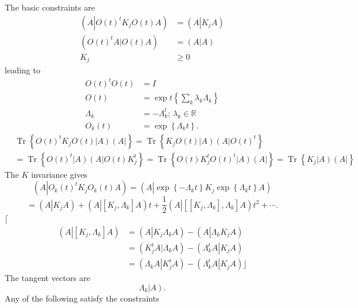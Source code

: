 \documentclass[aps,preprint]{revtex4}%
\begin{document}
The basic constraints are
\begin{align}
\left(  A\left\vert O\left(  t\right)  ^{t}K_{j}O\left(  t\right)  A\right.
\right)    & =\left(  A\left\vert K_{j}A\right.  \right)  \label{inv}\\
\left(  O\left(  t\right)  ^{t}A\left\vert O\left(  t\right)  A\right.
\right)    & =\left(  A\left\vert A\right.  \right)  \label{normaliz}\\
K_{j}  & \geq0\label{positiv}%
\end{align}
leading to
\begin{align}
O\left(  t\right)  ^{t}O\left(  t\right)   &  =I\\
O\left(  t\right)   &  =\exp t\left\{  \sum_{k}\lambda_{k}\Lambda_{k}\right\}
\\
\Lambda_{k} &  =-\Lambda_{k}^{t};\,\lambda_{k}\in\mathbb{R}\\
O_{k}\left(  t\right)   &  =\exp\left\{  \Lambda_{k}t\right\}  .
\end{align}%
\begin{align}
& \operatorname{Tr}\left\{  O\left(  t\right)  ^{t}K_{j}O\left(  t\right)
\left\vert A\right)  \left(  A\right\vert \right\}  =\operatorname{Tr}\left\{
K_{j}O\left(  t\right)  \left\vert A\right)  \left(  A\right\vert O\left(
t\right)  ^{t}\right\}  \\
& =\operatorname{Tr}\left\{  O\left(  t\right)  ^{t}\left\vert A\right)
\left(  A\right\vert O\left(  t\right)  K_{j}^{t}\right\}  =\operatorname{Tr}%
\left\{  O\left(  t\right)  K_{j}^{t}O\left(  t\right)  ^{t}\left\vert
A\right)  \left(  A\right\vert \right\}  =\operatorname{Tr}\left\{
K_{j}\left\vert A\right)  \left(  A\right\vert \right\}
\end{align}
The $K$ invariance gives
\begin{equation}
\left(  A\left\vert O_{k}\left(  t\right)  ^{t}K_{j}O_{k}\left(  t\right)
A\right.  \right)  =\left(  A\left\vert \exp\left\{  -\Lambda_{k}t\right\}
K_{j}\exp\left\{  \Lambda_{k}t\right\}  A\right.  \right)
\end{equation}%
\begin{equation}
=\left(  A\left\vert K_{j}A\right.  \right)  +\left(  A\left\vert \left[
K_{j},\Lambda_{k}\right]  A\right.  \right)  t+\frac{1}{2}\left(  A\left\vert
\left[  \left[  K_{j},\Lambda_{k}\right]  ,\Lambda_{k}\right]  A\right.
\right)  t^{2}+\cdots.
\end{equation}
$\lceil$%
\begin{align}
\left(  A\left\vert \left[  K_{j},\Lambda_{k}\right]  A\right.  \right)    &
=\left(  A\left\vert K_{j}\Lambda_{k}A\right.  \right)  -\left(  A\left\vert
\Lambda_{k}K_{j}A\right.  \right)  \\
& =\left(  K_{j}^{t}A\left\vert \Lambda_{k}A\right.  \right)  -\left(
\Lambda_{k}^{t}A\left\vert K_{j}A\right.  \right)  \\
& =\left(  \Lambda_{k}A\left\vert K_{j}^{t}A\right.  \right)  -\left(
\Lambda_{k}^{t}A\left\vert K_{j}A\right.  \right)  \rfloor
\end{align}
The tangent vectors are%
\begin{equation}
\Lambda_{k}\left\vert A\right)  .
\end{equation}
Any of the following satisfy the constraints
\end{document}
